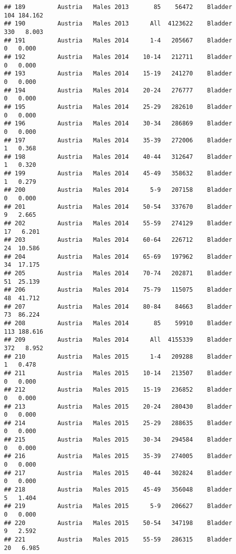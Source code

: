 \documentclass[
]{article}
\begin{document}
\begin{verbatim}
## 189         Austria   Males 2013       85    56472    Bladder    104 184.162
## 190         Austria   Males 2013      All  4123622    Bladder    330   8.003
## 191         Austria   Males 2014      1-4   205667    Bladder      0   0.000
## 192         Austria   Males 2014    10-14   212711    Bladder      0   0.000
## 193         Austria   Males 2014    15-19   241270    Bladder      0   0.000
## 194         Austria   Males 2014    20-24   276777    Bladder      0   0.000
## 195         Austria   Males 2014    25-29   282610    Bladder      0   0.000
## 196         Austria   Males 2014    30-34   286869    Bladder      0   0.000
## 197         Austria   Males 2014    35-39   272006    Bladder      1   0.368
## 198         Austria   Males 2014    40-44   312647    Bladder      1   0.320
## 199         Austria   Males 2014    45-49   358632    Bladder      1   0.279
## 200         Austria   Males 2014      5-9   207158    Bladder      0   0.000
## 201         Austria   Males 2014    50-54   337670    Bladder      9   2.665
## 202         Austria   Males 2014    55-59   274129    Bladder     17   6.201
## 203         Austria   Males 2014    60-64   226712    Bladder     24  10.586
## 204         Austria   Males 2014    65-69   197962    Bladder     34  17.175
## 205         Austria   Males 2014    70-74   202871    Bladder     51  25.139
## 206         Austria   Males 2014    75-79   115075    Bladder     48  41.712
## 207         Austria   Males 2014    80-84    84663    Bladder     73  86.224
## 208         Austria   Males 2014       85    59910    Bladder    113 188.616
## 209         Austria   Males 2014      All  4155339    Bladder    372   8.952
## 210         Austria   Males 2015      1-4   209288    Bladder      1   0.478
## 211         Austria   Males 2015    10-14   213507    Bladder      0   0.000
## 212         Austria   Males 2015    15-19   236852    Bladder      0   0.000
## 213         Austria   Males 2015    20-24   280430    Bladder      0   0.000
## 214         Austria   Males 2015    25-29   288635    Bladder      0   0.000
## 215         Austria   Males 2015    30-34   294584    Bladder      0   0.000
## 216         Austria   Males 2015    35-39   274005    Bladder      0   0.000
## 217         Austria   Males 2015    40-44   302824    Bladder      0   0.000
## 218         Austria   Males 2015    45-49   356048    Bladder      5   1.404
## 219         Austria   Males 2015      5-9   206627    Bladder      0   0.000
## 220         Austria   Males 2015    50-54   347198    Bladder      9   2.592
## 221         Austria   Males 2015    55-59   286315    Bladder     20   6.985

\end{verbatim}
\end{document}
